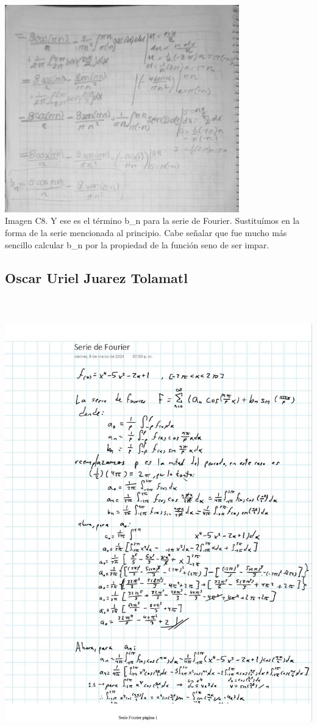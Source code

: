 \includegraphics[width=4.00521in,height=3.53949in]{media/image41.jpg}\\ Imagen C8. Y ese es el término b\_n para la serie de Fourier. Sustituímos en la forma de la serie mencionada al principio. Cabe señalar que fue mucho más sencillo calcular b\_n por la propiedad de la función seno de ser impar.

\subsection{Oscar Uriel Juarez Tolamatl}

\includegraphics[width=5.93125in,height=7.67516in]{media/image59.jpg}

